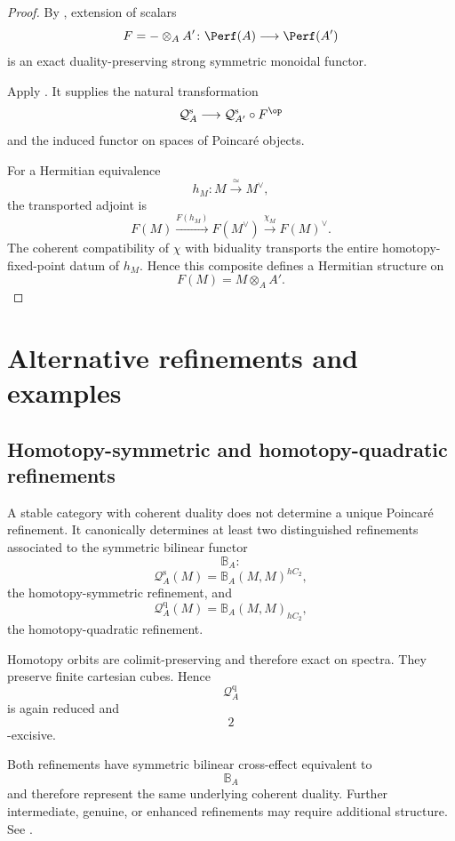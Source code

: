 \begin{proof}
By
,
extension of scalars
\[
    F
    =
    -\otimes_A A'
    \colon
    \Perf(A)
    \longrightarrow
    \Perf(A')
\]
is an exact duality-preserving strong symmetric monoidal functor.

Apply
.
It supplies the natural transformation
\[
    \mathcal Q_A^{\mathrm s}
    \longrightarrow
    \mathcal Q_{A'}^{\mathrm s}
    \circ
    F^{\op}
\]
and the induced functor on spaces of Poincaré objects.

For a Hermitian equivalence
\[
    h_M
    \colon
    M
    \xrightarrow{\;\simeq\;}
    M^\vee,
\]
the transported adjoint is
\[
    F(M)
    \xrightarrow{F(h_M)}
    F(M^\vee)
    \xrightarrow{\chi_M}
    F(M)^\vee.
\]
The coherent compatibility of $\chi$ with biduality transports the entire
homotopy-fixed-point datum of $h_M$. Hence this composite defines a
Hermitian structure on
\[
    F(M)
    =
    M\otimes_A A'.
\]
\end{proof}
\section{Alternative refinements and examples}
\label{sec:examples-perfect-poincare}

\subsection{Homotopy-symmetric and homotopy-quadratic refinements}

\begin{remark}
\label{rem:poincare-infinity-category}
A stable category with coherent duality does not determine a unique
Poincar\'e refinement. It canonically determines at least two
distinguished refinements associated to the symmetric bilinear functor
\[
    \mathbb B_A:
\]
\[
    \mathcal Q_A^{\mathrm s}(M)
    =
    \mathbb B_A(M,M)^{hC_2},
\]
the homotopy-symmetric refinement, and
\[
    \mathcal Q_A^{\mathrm q}(M)
    =
    \mathbb B_A(M,M)_{hC_2},
\]
the homotopy-quadratic refinement.

Homotopy orbits are colimit-preserving and therefore exact on spectra.
They preserve finite cartesian cubes. Hence
\[
    \mathcal Q_A^{\mathrm q}
\]
is again reduced and
\[
    2
\]
-excisive.

Both refinements have symmetric bilinear cross-effect equivalent to
\[
    \mathbb B_A
\]
and therefore represent the same underlying coherent duality. Further
intermediate, genuine, or enhanced refinements may require additional
structure. See
\cite{CalmesDottoHarpazEtAl}.
\end{remark}


